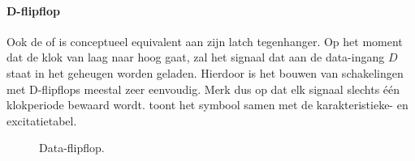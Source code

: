 \paragraph{D-flipflop} Ook de  of  is conceptueel equivalent aan zijn latch tegenhanger. Op het moment dat de klok van laag naar hoog gaat, zal het signaal dat aan de data-ingang $D$ staat in het geheugen worden geladen. Hierdoor is het bouwen van schakelingen met D-flipflops meestal zeer eenvoudig. Merk dus op dat elk signaal slechts \'e\'en klokperiode bewaard wordt.  toont het symbool samen met de karakteristieke- en excitatietabel.
\begin{figure}[hbt]
\centering
{}
\caption{Data-flipflop.}
\end{figure}
